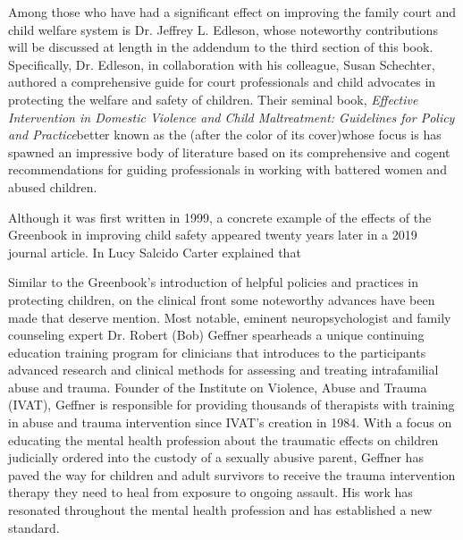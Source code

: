 Among those who have had a significant effect on improving the
family court and child welfare system is Dr. Jeffrey L. Edleson, whose
noteworthy contributions will be discussed at length in the addendum to
the third section of this book. Specifically, Dr. Edleson, in collaboration
with his colleague, Susan Schechter, authored a comprehensive guide
for court professionals and child advocates in protecting the welfare and
safety of children. Their seminal book, \textit{Effective Intervention in Domestic
Violence and Child Maltreatment: 
Guidelines for Policy and Practice}\mdash{}better 
known as the  (after the color of its cover)\mdash{}whose
focus is \hspace{1pt} has spawned an impressive body of literature
based on its comprehensive and cogent recommendations for guiding
professionals in working with battered women and abused children. \pfl{}

Although it was first written in 1999, a concrete example of the effects of
the Greenbook in improving child safety appeared twenty years later
in a 2019 journal article. In 
Lucy Salcido Carter explained that \hspace{1pt} \pfl{}

Similar to the Greenbook's introduction of helpful policies and practices in protecting children, on the clinical front some noteworthy
advances have been made that deserve mention. Most notable, eminent neuropsychologist and family counseling expert Dr. Robert (Bob)
Geffner spearheads a unique continuing education training program
for clinicians that introduces to the participants advanced research and clinical methods
for assessing and treating intrafamilial abuse and trauma. Founder of
the Institute on Violence, Abuse and Trauma (IVAT),
Geffner is responsible for providing thousands of therapists with training in abuse and trauma intervention since IVAT's creation in 1984. With a focus on educating the mental health profession about the traumatic effects on children judicially ordered into the custody of a sexually abusive parent, 
Geffner has paved the way for children and adult survivors to receive the trauma intervention therapy they need to heal from
exposure to ongoing assault. His work has resonated throughout the
mental health profession and has established a new standard. \pfl{}

